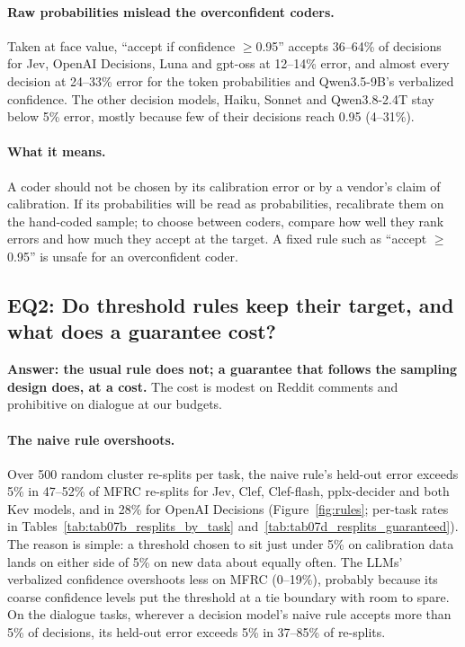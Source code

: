 \paragraph{Raw probabilities mislead the overconfident coders.} Taken at face value, ``accept if confidence $\ge$0.95''
accepts 36--64\% of decisions for Jev, OpenAI Decisions, Luna and gpt-oss at 12--14\% error, and almost every decision at
24--33\% error for the token probabilities and Qwen3.5-9B's verbalized confidence. The other decision models, Haiku, Sonnet
and Qwen3.8-2.4T stay below 5\% error, mostly because few of their decisions reach 0.95 (4--31\%).

\paragraph{What it means.} A coder should not be chosen by its calibration error or by a vendor's claim of calibration.
If its probabilities will be read as probabilities, recalibrate them on the hand-coded sample; to choose between coders,
compare how well they rank errors and how much they accept at the target. A fixed rule such as ``accept $\ge$0.95'' is unsafe
for an overconfident coder.

\subsection{EQ2: Do threshold rules keep their target, and what does a guarantee cost?}
\label{sec:eq2}

\textbf{Answer: the usual rule does not; a guarantee that follows the sampling design does, at a cost.} The cost is modest on
Reddit comments and prohibitive on dialogue at our budgets.

\paragraph{The naive rule overshoots.} Over 500 random cluster re-splits per task, the naive rule's held-out error exceeds 5\%
in 47--52\% of MFRC re-splits for Jev, Clef, Clef-flash, pplx-decider and both Kev models, and in 28\% for OpenAI Decisions
(Figure~\ref{fig:rules}; per-task rates in Tables~\ref{tab:tab07b_resplits_by_task} and~\ref{tab:tab07d_resplits_guaranteed}).
The reason is simple: a threshold chosen to sit just under 5\% on calibration data lands on either side of 5\% on new data
about equally often. The LLMs' verbalized confidence overshoots less on MFRC (0--19\%), probably because its coarse confidence
levels put the threshold at a tie boundary with room to spare. On the dialogue tasks, wherever a decision model's naive rule
accepts more than 5\% of decisions, its held-out error exceeds 5\% in 37--85\% of re-splits.

